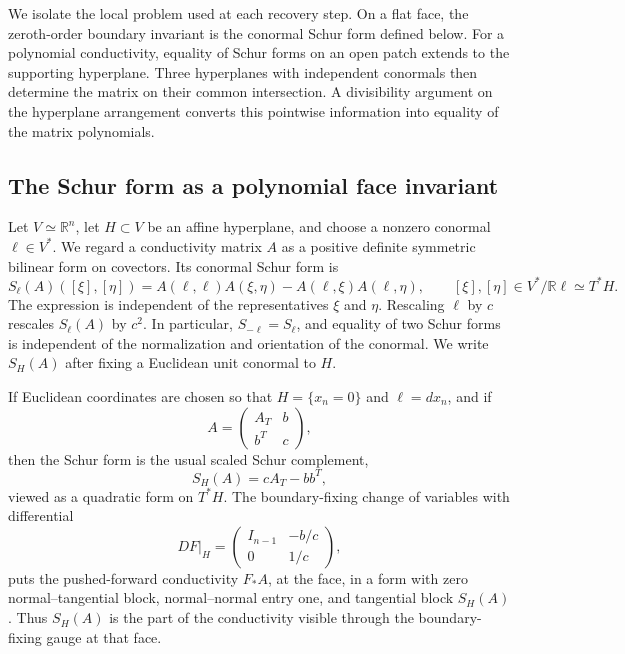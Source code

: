 \documentclass[11pt,oneside]{article}
\newcommand{\R}{\mathbb R}
\begin{document}
We isolate the local problem used at each recovery step.  On a flat face, the
zeroth-order boundary invariant is the conormal Schur form defined below.  For
a polynomial conductivity, equality of Schur forms on an open patch extends to
the supporting hyperplane.  Three hyperplanes with independent conormals then
determine the matrix on their common intersection.  A divisibility argument on
the hyperplane arrangement converts this pointwise information into equality
of the matrix polynomials.

\subsection{The Schur form as a polynomial face invariant}

Let \(V\simeq\R^n\), let \(H\subset V\) be an affine hyperplane, and choose a
nonzero conormal \(\ell\in V^*\).  We regard a conductivity matrix \(A\) as a
positive definite symmetric bilinear form on covectors.  Its conormal Schur
form is
\begin{equation}
  S_{\ell}(A)([\xi],[\eta])
  =A(\ell,\ell)A(\xi,\eta)-A(\ell,\xi)A(\ell,\eta),
  \qquad [\xi],[\eta]\in V^*/\R\ell\simeq T^*H .
  \label{eq:conormal-schur-form}
\end{equation}
The expression is independent of the representatives \(\xi\) and \(\eta\).
Rescaling \(\ell\) by \(c\) rescales \(S_\ell(A)\) by \(c^2\).  In particular,
\(S_{-\ell}=S_\ell\), and equality of two Schur forms is independent of the
normalization and orientation of the conormal.  We write \(S_H(A)\) after
fixing a Euclidean unit conormal to \(H\).

If Euclidean coordinates are chosen so that \(H=\{x_n=0\}\) and
\(\ell=dx_n\), and if
\begin{equation}
  A=
  \begin{pmatrix}
    A_T & b\\ b^T & c
  \end{pmatrix},
  \label{eq:block-form}
\end{equation}
then the Schur form is the usual scaled Schur complement,
\begin{equation}
  S_H(A)=cA_T-bb^T,
  \label{eq:schur-form}
\end{equation}
viewed as a quadratic form on \(T^*H\).  The boundary-fixing change of variables
with differential
\begin{equation}
  DF|_H=
  \begin{pmatrix}
    I_{n-1} & -b/c\\ 0 & 1/c
  \end{pmatrix},
\end{equation}
puts the pushed-forward conductivity \(F_*A\), at the face, in a form with
zero normal--tangential block, normal--normal entry one, and tangential block
\(S_H(A)\).  Thus \(S_H(A)\) is the part of the conductivity visible through
the boundary-fixing gauge at that face.
\end{document}
